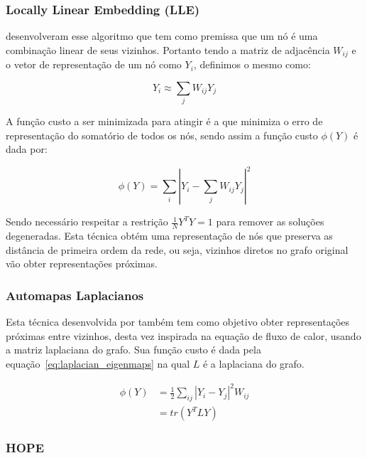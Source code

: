 \subsubsection{Locally Linear Embedding (LLE)}

\citet{roweis00} desenvolveram esse algoritmo que tem como premissa que um nó é
uma combinação linear de seus vizinhos.
Portanto tendo a matriz de adjacência $W_{ij}$ e o vetor de representação de um
nó como $Y_i$, definimos o mesmo como:

\begin{equation}
    Y_i \approx \sum_j{W_{ij}Y_j}
\end{equation}

A função custo a ser minimizada para atingir é a que minimiza o erro de
representação do somatório de todos os nós, sendo assim a função custo $\phi(Y)$
é dada por:

\begin{equation}
    \phi(Y) = \sum_i{|Y_i - \sum_j{W_{ij}Y_j}|^2}
\end{equation}

Sendo necessário respeitar a restrição $\frac{1}{N}Y^TY = 1$ para remover as
soluções degeneradas.
Esta técnica obtém uma representação de nós que preserva as distância de
primeira ordem da rede, ou seja, vizinhos diretos no grafo original vão obter
representações próximas.

\subsubsection{Automapas Laplacianos}

Esta técnica desenvolvida por \citet{belkin02} também tem como objetivo obter
representações próximas entre vizinhos, desta vez inspirada na equação de fluxo
de calor, usando a matriz laplaciana do grafo.
Sua função custo é dada pela equação~\ref{eq:laplacian_eigenmaps} na qual $L$ é
a laplaciana do grafo.

\begin{equation} \label{eq:laplacian_eigenmaps}
\begin{aligned}
    \phi(Y) &= \frac{1}{2} \sum_{ij}{|Y_i - Y_j|^2 W_{ij}} \\
            &= tr(Y^TLY)
\end{aligned}
\end{equation}

\subsubsection{HOPE}

